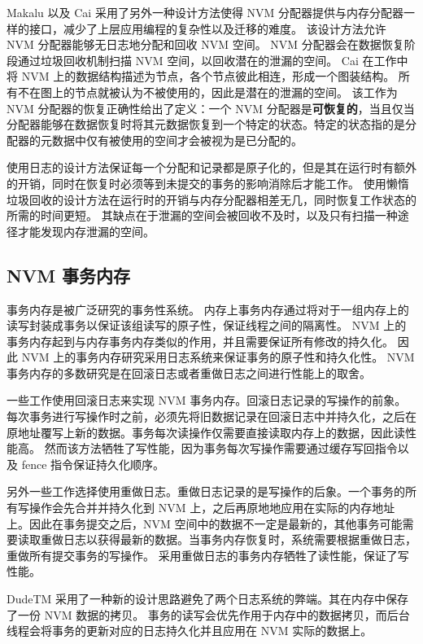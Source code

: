 Makalu\cite{bhandari_makalu_2016} 以及 Cai\cite{cai_understanding_2020} 采用了另外一种设计方法使得 NVM 分配器提供与内存分配器一样的接口，减少了上层应用编程的复杂性以及迁移的难度。
该设计方法允许 NVM 分配器能够无日志地分配和回收 NVM 空间。
NVM 分配器会在数据恢复阶段通过垃圾回收机制扫描 NVM 空间，以回收潜在的泄漏的空间。
Cai 在工作中将 NVM 上的数据结构描述为节点，各个节点彼此相连，形成一个图装结构。
所有不在图上的节点就被认为不被使用的，因此是潜在的泄漏的空间。
该工作为 NVM 分配器的恢复正确性给出了定义：一个 NVM 分配器是\textbf{可恢复的}，当且仅当
分配器能够在数据恢复时将其元数据恢复到一个特定的状态。特定的状态指的是分配器的元数据中仅有被使用的空间才会被视为是已分配的。

使用日志的设计方法保证每一个分配和记录都是原子化的，但是其在运行时有额外的开销，同时在恢复时必须等到未提交的事务的影响消除后才能工作。
使用懒惰垃圾回收的设计方法在运行时的开销与内存分配器相差无几，同时恢复工作状态的所需的时间更短。
其缺点在于泄漏的空间会被回收不及时，以及只有扫描一种途径才能发现内存泄漏的空间。



\subsection{NVM 事务内存}

事务内存是被广泛研究的事务性系统。
内存上事务内存通过将对于一组内存上的读写封装成事务以保证该组读写的原子性，保证线程之间的隔离性。
NVM 上的事务内存起到与内存事务内存类似的作用，并且需要保证所有修改的持久化。
因此 NVM 上的事务内存研究采用日志系统来保证事务的原子性和持久化性。
NVM 事务内存的多数研究是在回滚日志或者重做日志之间进行性能上的取舍。

一些工作使用回滚日志来实现 NVM 事务内存\cite{coburn_nv-heaps_2011, kolli_high-performance_2016}。回滚日志记录的写操作的前象。每次事务进行写操作时之前，必须先将旧数据记录在回滚日志中并持久化，之后在原地址覆写上新的数据。事务每次读操作仅需要直接读取内存上的数据，因此读性能高。
然而该方法牺牲了写性能，因为事务每次写操作需要通过缓存写回指令以及 fence 指令保证持久化顺序。


另外一些工作选择使用重做日志\cite{volos_mnemosyne_2011, giles_softwrap_2015}。重做日志记录的是写操作的后象。一个事务的所有写操作会先合并并持久化到 NVM 上，之后再原地地应用在实际的内存地址上。因此在事务提交之后，NVM 空间中的数据不一定是最新的，其他事务可能需要读取重做日志以获得最新的数据。当事务内存恢复时，系统需要根据重做日志，重做所有提交事务的写操作。
采用重做日志的事务内存牺牲了读性能，保证了写性能。

DudeTM 采用了一种新的设计思路避免了两个日志系统的弊端\cite{liu_dudetm_2017}。其在内存中保存了一份 NVM 数据的拷贝。
事务的读写会优先作用于内存中的数据拷贝，而后台线程会将事务的更新对应的日志持久化并且应用在 NVM 实际的数据上。

